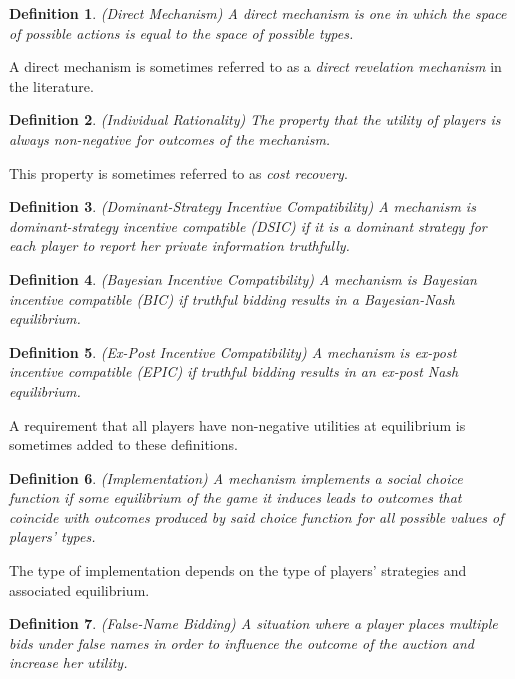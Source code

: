 \documentclass{article}
\newtheorem{definition}{Definition}
\begin{document}
\begin{definition}
(Direct Mechanism) A direct mechanism is one in which the space of possible actions is equal to the space of possible types.
\end{definition}

A direct mechanism is sometimes referred to as a \textit{direct revelation mechanism} in the literature.

\begin{definition}
(Individual Rationality) The property that the utility of players is always non-negative for outcomes of the mechanism.
\end{definition}

This property is sometimes referred to as \textit{cost recovery}.

\begin{definition}
(Dominant-Strategy Incentive Compatibility) A mechanism is dominant-strategy incentive compatible (DSIC) if it is a dominant strategy for each player to report her private information truthfully.
\end{definition}

\begin{definition}
(Bayesian Incentive Compatibility) A mechanism is Bayesian incentive compatible (BIC) if truthful bidding results in a Bayesian-Nash equilibrium.
\end{definition}

\begin{definition}
(Ex-Post Incentive Compatibility) A mechanism is ex-post incentive compatible (EPIC) if truthful bidding results in an ex-post Nash equilibrium.
\end{definition}

A requirement that all players have non-negative utilities at equilibrium is sometimes added to these definitions.

\begin{definition}
(Implementation) A mechanism implements a social choice function if some equilibrium of the game it induces leads to outcomes that coincide with outcomes produced by said choice function for all possible values of players' types.
\end{definition}

The type of implementation depends on the type of players' strategies and associated equilibrium.

\begin{definition}
(False-Name Bidding) A situation where a player places multiple bids under false names in order to influence the outcome of the auction and increase her utility.
\end{definition}
\end{document}
